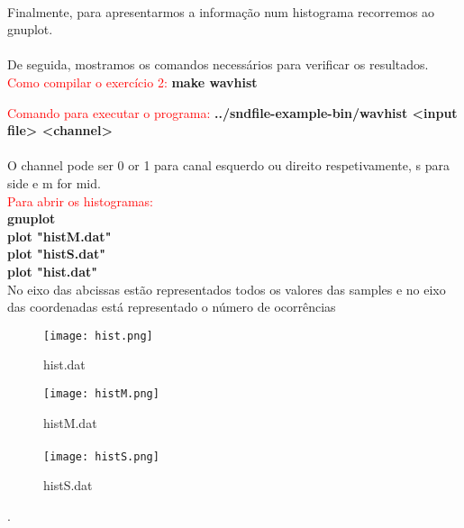 \documentclass{report}
\begin{document}
\paragraph{}
Finalmente, para apresentarmos a informação num histograma recorremos ao gnuplot.
\paragraph{}
De seguida, mostramos os comandos necessários para verificar os resultados.\\

\textcolor{red}{Como compilar o exercício 2:}
\textbf{make wav\textunderscore hist}

\textcolor{red}{Comando para executar o programa:} \textbf{../sndfile-example-bin/wav\textunderscore hist <input file> <channel>}
\paragraph{}
O channel pode ser 0 or 1 para canal esquerdo ou direito respetivamente, s para side e m for mid.\\
\textcolor{red}{Para abrir os histogramas:}\\
\textbf{gnuplot}\\
\textbf{plot "histM.dat"}\\
\textbf{plot "histS.dat"}\\
\textbf{plot "hist.dat"}\\
No eixo das abcissas estão representados todos os valores das samples e no eixo das coordenadas está representado o número de ocorrências
\begin{figure} [h!]
\center
\texttt{[image: hist.png]}
\caption{hist.dat}
\label{fig: hist.dat}
\end{figure}

\begin{figure} [h!]
\texttt{[image: histM.png]}
\caption{histM.dat}
\label{fig: histM.dat}
\end{figure}
\paragraph{}
\begin{center}
\begin{figure} [h!]
\texttt{[image: histS.png]}
\caption{histS.dat}
\label{fig: histS.dat}
\end{figure}
\end{center}
.
\end{document}
